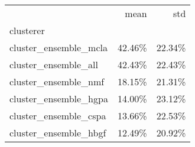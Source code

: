 \begin{tabular}{lrr}
\toprule
{} &   mean &    std \\
clusterer             &        &        \\
\midrule
cluster\_ensemble\_mcla & 42.46\% & 22.34\% \\
cluster\_ensemble\_all  & 42.43\% & 22.43\% \\
cluster\_ensemble\_nmf  & 18.15\% & 21.31\% \\
cluster\_ensemble\_hgpa & 14.00\% & 23.12\% \\
cluster\_ensemble\_cspa & 13.66\% & 22.53\% \\
cluster\_ensemble\_hbgf & 12.49\% & 20.92\% \\
\bottomrule
\end{tabular}

